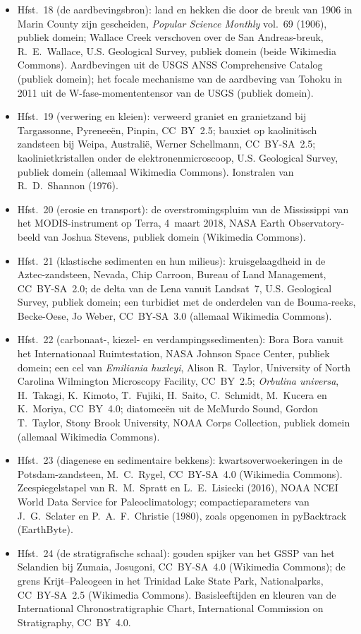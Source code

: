 \begin{itemize}
  \item Hfst.~18 (de aardbevingsbron): land en hekken die door de breuk van 1906 in Marin County zijn gescheiden, \emph{Popular Science Monthly} vol.~69 (1906), publiek domein; Wallace Creek verschoven over de San Andreas-breuk, R.~E.~Wallace, U.S. Geological Survey, publiek domein (beide Wikimedia Commons). Aardbevingen uit de USGS ANSS Comprehensive Catalog (publiek domein); het focale mechanisme van de aardbeving van Tohoku in 2011 uit de W-fase-momententensor van de USGS (publiek domein).
  \item Hfst.~19 (verwering en kleien): verweerd graniet en granietzand bij Targassonne, Pyreneeën, Pinpin, CC~BY~2.5; bauxiet op kaolinitisch zandsteen bij Weipa, Australië, Werner Schellmann, CC~BY-SA~2.5; kaolinietkristallen onder de elektronenmicroscoop, U.S. Geological Survey, publiek domein (allemaal Wikimedia Commons). Ionstralen van R.~D.~Shannon (1976).
  \item Hfst.~20 (erosie en transport): de overstromingspluim van de Mississippi van het MODIS-instrument op Terra, 4~maart 2018, NASA Earth Observatory-beeld van Joshua Stevens, publiek domein (Wikimedia Commons).
  \item Hfst.~21 (klastische sedimenten en hun milieus): kruisgelaagdheid in de Aztec-zandsteen, Nevada, Chip Carroon, Bureau of Land Management, CC~BY-SA~2.0; de delta van de Lena vanuit Landsat~7, U.S. Geological Survey, publiek domein; een turbidiet met de onderdelen van de Bouma-reeks, Becke-Oese, Jo Weber, CC~BY-SA~3.0 (allemaal Wikimedia Commons).
  \item Hfst.~22 (carbonaat-, kiezel- en verdampingssedimenten): Bora Bora vanuit het Internationaal Ruimtestation, NASA Johnson Space Center, publiek domein; een cel van \emph{Emiliania huxleyi}, Alison R.~Taylor, University of North Carolina Wilmington Microscopy Facility, CC~BY~2.5; \emph{Orbulina universa}, H.~Takagi, K.~Kimoto, T.~Fujiki, H.~Saito, C.~Schmidt, M.~Kucera en K.~Moriya, CC~BY~4.0; diatomeeën uit de McMurdo Sound, Gordon T.~Taylor, Stony Brook University, NOAA Corps Collection, publiek domein (allemaal Wikimedia Commons).
  \item Hfst.~23 (diagenese en sedimentaire bekkens): kwartsoverwoekeringen in de Potsdam-zandsteen, M.~C.~Rygel, CC~BY-SA~4.0 (Wikimedia Commons). Zeespiegelstapel van R.~M.~Spratt en L.~E.~Lisiecki (2016), NOAA NCEI World Data Service for Paleoclimatology; compactieparameters van J.~G.~Sclater en P.~A.~F.~Christie (1980), zoals opgenomen in pyBacktrack (EarthByte).
  \item Hfst.~24 (de stratigrafische schaal): gouden spijker van het GSSP van het Selandien bij Zumaia, Josugoni, CC~BY-SA~4.0 (Wikimedia Commons); de grens Krijt--Paleogeen in het Trinidad Lake State Park, Nationalparks, CC~BY-SA~2.5 (Wikimedia Commons). Basisleeftijden en kleuren van de International Chronostratigraphic Chart, International Commission on Stratigraphy, CC~BY~4.0.

\end{itemize}
